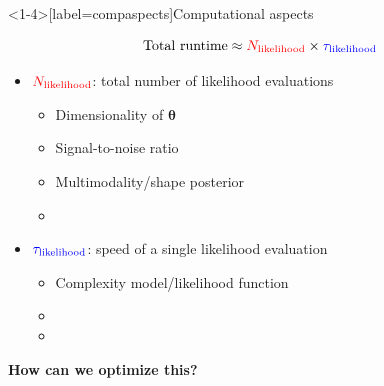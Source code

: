 \documentclass[usenames,dvipsnames,t]{beamer}
\newcommand{\boldtheta}{\boldsymbol{\theta}}
\begin{document}
\begin{frame}<1-4>[label=compaspects]{Computational aspects}

  \def\x{3mm}
  \def\y{1mm}

  \begin{equation*}
    {\rm{Total \ runtime}} \approx \textcolor{red}{N_{{\rm{likelihood}}}} \times \textcolor{blue}{\tau_{{\rm{likelihood}}}}
  \end{equation*}

  \pause

  \begin{itemize}
    \item $\textcolor{red}{N_{{\rm{likelihood}}}}$: total number of likelihood evaluations
    \begin{itemize}
      \item Dimensionality of $\boldtheta$
      
      \vspace{\y}
      
      \item Signal-to-noise ratio
      
      \vspace{\y}
      
      \item Multimodality/shape posterior
      
      \vspace{\y}

      \item {}

    \end{itemize}

    \vspace{\x}
    \pause

    \item $\textcolor{blue}{\tau_{{\rm{likelihood}}}}$: speed of a single likelihood evaluation
    \begin{itemize}
      \item Complexity model/likelihood function

      \vspace{\y}

      \item {}


      \vspace{\y}
      
      \item {}
    \end{itemize}
  \end{itemize}

  \pause
  \vspace{6mm}

  \textbf{How can we optimize this?}
\end{frame}
\end{document}

